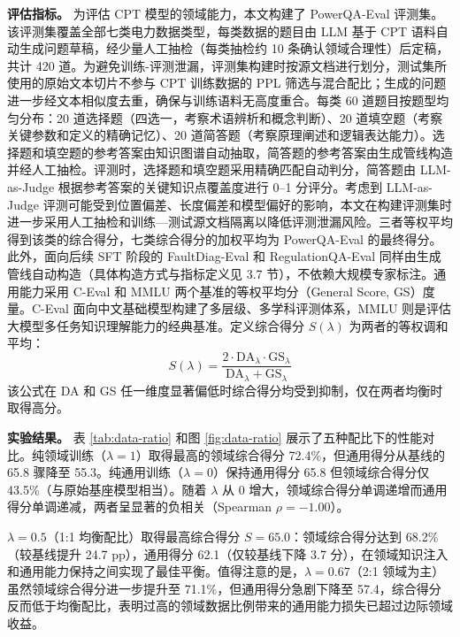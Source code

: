 \documentclass[fontset=fandol,type=master,campus=shenzhen,etitleauto=true]{hithesisbook}
\begin{document}
\textbf{评估指标。} 为评估 CPT 模型的领域能力，本文构建了 PowerQA-Eval 评测集。该评测集覆盖全部七类电力数据类型，每类数据的题目由 LLM 基于 CPT 语料自动生成问题草稿，经少量人工抽检（每类抽检约 10 条确认领域合理性）后定稿，共计 420 道。为避免训练-评测泄漏，评测集构建时按源文档进行划分，测试集所使用的原始文本切片不参与 CPT 训练数据的 PPL 筛选与混合配比；生成的问题进一步经文本相似度去重，确保与训练语料无高度重合。每类 60 道题目按题型均匀分布：20 道选择题（四选一，考察术语辨析和概念判断）、20 道填空题（考察关键参数和定义的精确记忆）、20 道简答题（考察原理阐述和逻辑表达能力）。选择题和填空题的参考答案由知识图谱自动抽取，简答题的参考答案由生成管线构造并经人工抽检。评测时，选择题和填空题采用精确匹配自动判分，简答题由 LLM-as-Judge 根据参考答案的关键知识点覆盖度进行 0--1 分评分。考虑到 LLM-as-Judge 评测可能受到位置偏差、长度偏差和模型偏好的影响\cite{ref65}，本文在构建评测集时进一步采用人工抽检和训练—测试源文档隔离以降低评测泄漏风险。三者等权平均得到该类的综合得分，七类综合得分的加权平均为 PowerQA-Eval 的最终得分。此外，面向后续 SFT 阶段的 FaultDiag-Eval 和 RegulationQA-Eval 同样由生成管线自动构造（具体构造方式与指标定义见 3.7 节），不依赖大规模专家标注。通用能力采用 C-Eval 和 MMLU 两个基准的等权平均分（General Score, GS）度量。C-Eval 面向中文基础模型构建了多层级、多学科评测体系\cite{ref66}，MMLU 则是评估大模型多任务知识理解能力的经典基准\cite{ref67}。定义综合得分 $S(\lambda)$ 为两者的等权调和平均：
\begin{equation}
S(\lambda) = \frac{2 \cdot \text{DA}_\lambda \cdot \text{GS}_\lambda}{\text{DA}_\lambda + \text{GS}_\lambda}
\end{equation}
该公式在 DA 和 GS 任一维度显著偏低时综合得分均受到抑制，仅在两者均衡时取得高分。

\textbf{实验结果。} 表 \ref{tab:data-ratio} 和图 \ref{fig:data-ratio} 展示了五种配比下的性能对比。纯领域训练（$\lambda = 1$）取得最高的领域综合得分 72.4\%，但通用得分从基线的 65.8 骤降至 55.3。纯通用训练（$\lambda = 0$）保持通用得分 65.8 但领域综合得分仅 43.5\%（与原始基座模型相当）。随着 $\lambda$ 从 0 增大，领域综合得分单调递增而通用得分单调递减，两者呈显著的负相关（Spearman $\rho = -1.00$）。

$\lambda = 0.5$（1:1 均衡配比）取得最高综合得分 $S = 65.0$：领域综合得分达到 68.2\%（较基线提升 24.7 pp），通用得分 62.1（仅较基线下降 3.7 分），在领域知识注入和通用能力保持之间实现了最佳平衡。值得注意的是，$\lambda = 0.67$（2:1 领域为主）虽然领域综合得分进一步提升至 71.1\%，但通用得分急剧下降至 57.4，综合得分反而低于均衡配比，表明过高的领域数据比例带来的通用能力损失已超过边际领域收益。
\end{document}
